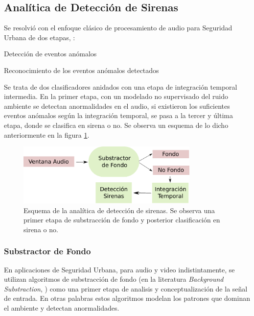 \documentclass{article}
\begin{document}
\subsection{Analítica de Detección de Sirenas}
Se resolvió con el enfoque clásico de procesamiento de audio para Seguridad Urbana de dos etapas, \cite{lecomte2011abnormal}:
\begin{enumerate}
\begin{item}
Detección de eventos anómalos
\end{item}
\begin{item}
Reconocimiento de los eventos anómalos detectados
\end{item}
\end{enumerate}

Se trata de dos clasificadores anidados con una etapa de integración temporal intermedia. En la primer etapa, con un modelado no supervisado del ruido ambiente se detectan anormalidades en el audio, si existieron los suficientes eventos anómalos según la integración temporal, se pasa a la tercer y última etapa, donde se clasifica en sirena o no. Se observa un esquema de lo dicho anteriormente en la figura \ref{fig:deteccion_sirenas}. 
 
\begin{figure}[h]
\begin{center}
\includegraphics[width=0.8\textwidth]{deteccion_sirenas} 
\caption{Esquema de la analítica de detección de sirenas. Se observa una primer etapa de substracción de fondo y posterior clasificación en sirena o no.}
\label{fig:deteccion_sirenas}
\end{center}
\end{figure}

\subsubsection{Substractor de Fondo}
En aplicaciones de Seguridad Urbana, para audio y video indistintamente, se utilizan algoritmos de substracción de fondo (en la literatura \textit{Background Substraction}, \cite{Crocco:2016:ASS:2891449.2871183}) como una primer etapa de analisis y conceptualización de la señal de entrada. En otras palabras estos algoritmos modelan los patrones que dominan el ambiente y detectan anormalidades.
\smallskip 
\end{document}
